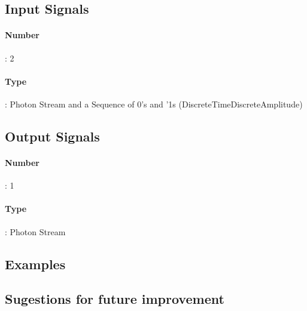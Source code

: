 \subsection*{Input Signals}
\paragraph*{Number}: 2
\paragraph*{Type}: Photon Stream and a Sequence of 0's and '1s (DiscreteTimeDiscreteAmplitude)

\subsection*{Output Signals}
\paragraph*{Number}: 1
\paragraph*{Type}: Photon Stream

\subsection*{Examples}


\subsection*{Sugestions for future improvement} 